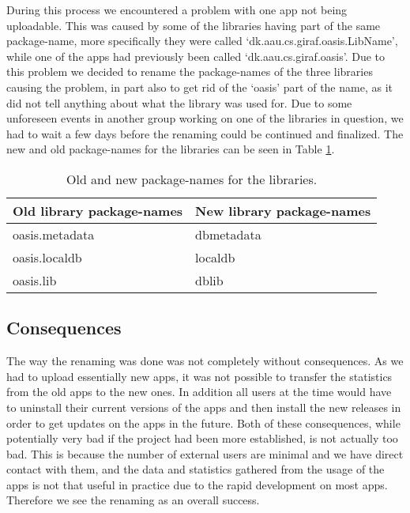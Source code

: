During this process we encountered a problem with one app not being uploadable. This was caused by some of the libraries having part of the same package-name, more specifically they were called ‘dk.aau.cs.giraf.oasis.LibName’, while one of the apps had previously been called ‘dk.aau.cs.giraf.oasis’. Due to this problem we decided to rename the package-names of the three libraries causing the problem, in part also to get rid of the ‘oasis’ part of the name, as it did not tell anything about what the library was used for. Due to some unforeseen events in another group working on one of the libraries in question, we had to wait a few days before the renaming could be continued and finalized. The new and old package-names for the libraries can be seen in Table \ref{Sprint3_package_names_libraries}.

\begin{table}
	\centering
	\begin{tabular}{ll}
		\textbf{Old library package-names} & \textbf{New library package-names}\\ \hline \noalign{\vskip 2mm}
		oasis.metadata & dbmetadata\\ \hline
		oasis.localdb & localdb\\ \hline
		oasis.lib & dblib\\ \hline
	\end{tabular}
	\caption{Old and new package-names for the libraries.}
	\label{Sprint3_package_names_libraries}
\end{table}

\subsection{Consequences}
The way the renaming was done was not completely without consequences. As we had to upload essentially new apps, it was not possible to transfer the statistics from the old apps to the new ones. In addition all users at the time would have to uninstall their current versions of the apps and then install the new releases in order to get updates on the apps in the future. Both of these consequences, while potentially very bad if the project had been more established, is not actually too bad. This is because the number of external users are minimal and we have direct contact with them, and the data and statistics gathered from the usage of the apps is not that useful in practice due to the rapid development on most apps. Therefore we see the renaming as an overall success.
